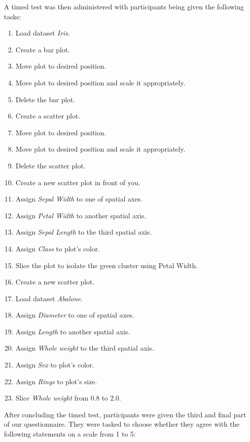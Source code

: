 \documentclass[thesis=M,english,hidelinks]{FITthesisXE}[2012/06/26]
\begin{document}
A timed test was then administered with participants being given the following tasks:

\begin{enumerate}
\item Load dataset \emph{Iris}.
\item Create a bar plot.
\item Move plot to desired position.
\item Move plot to desired position and scale it appropriately.
\item Delete the bar plot.
\item Create a scatter plot.
\item Move plot to desired position.
\item Move plot to desired position and scale it appropriately.
\item Delete the scatter plot.
\item Create a new scatter plot in front of you.
\item Assign \emph{Sepal Width} to one of spatial axes.
\item Assign \emph{Petal Width} to another spatial axis.
\item Assign \emph{Sepal Length} to the third spatial axis.
\item Assign \emph{Class} to plot's color.
\item Slice the plot to isolate the green cluster using Petal Width.
\item Create a new scatter plot.
\item Load dataset \emph{Abalone}.
\item Assign \emph{Diameter} to one of spatial axes.
\item Assign \emph{Length} to another spatial axis.
\item Assign \emph{Whole weight} to the third spatial axis.
\item Assign \emph{Sex} to plot's color.
\item Assign \emph{Rings} to plot's size.
\item Slice \emph{Whole weight} from 0.8 to 2.0.
\end{enumerate}

After concluding the timed test, participants were given the third and final part of our questionnaire. They were tasked to choose whether they agree with the following statements on a scale from 1 to 5:
\end{document}
